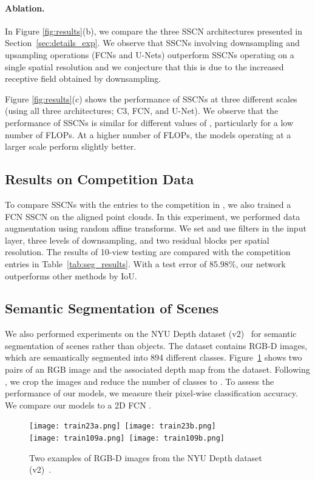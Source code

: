 \documentclass[10pt,twocolumn,letterpaper]{article}
\begin{document}
\paragraph{Ablation.} In Figure \ref{fig:results}(b), we compare the three SSCN architectures presented in Section~\ref{sec:details_exp}. We observe that SSCNs involving downsampling and upsampling operations (FCNs and U-Nets) outperform SSCNs operating on a single spatial resolution and we conjecture that this is due to the increased receptive field obtained by downsampling.

Figure \ref{fig:results}(c) shows the performance of SSCNs at three different scales  (using all three architectures; C3, FCN, and U-Net). We observe that the performance of SSCNs is similar for different values of , particularly for a low number of FLOPs. At a higher number of FLOPs, the models operating at a larger scale perform slightly better.

\subsection{Results on Competition Data}\label{subsec:aligned}
To compare SSCNs with the entries to the competition in \cite{yi2017large}, we also trained a FCN SSCN on the aligned point clouds. In this experiment, we performed data augmentation using random affine transforms. We set  and use  filters in the input layer, three levels of downsampling, and two residual blocks per spatial resolution. The results of 10-view testing are compared with the competition entries in Table~\ref{tab:seg_results}. With a test error of 85.98\%, our network outperforms other methods by  IoU.
 \subsection{Semantic Segmentation of Scenes}
We also performed experiments on the NYU Depth dataset (v2)~\cite{silberman2012indoor} for semantic segmentation of scenes rather than objects. The dataset contains  RGB-D images, which are semantically segmented into 894 different classes. Figure~\ref{fig:nyu} shows two pairs of an RGB image and the associated depth map from the dataset. Following \cite{conf/cvpr/GuptaAM13,long2015fully}, we crop the images and reduce the number of classes to . To assess the performance of our models, we measure their pixel-wise classification accuracy. We compare our models to a 2D FCN \cite{long2015fully}.

\begin{figure}[t]
\texttt{[image: train23a.png]}\ \texttt{[image: train23b.png]}\\
\texttt{[image: train109a.png]}\ \texttt{[image: train109b.png]}\\
\caption{Two examples of RGB-D images from the NYU Depth dataset (v2)~\cite{silberman2012indoor}.}
\label{fig:nyu}
\end{figure}
\end{document}
